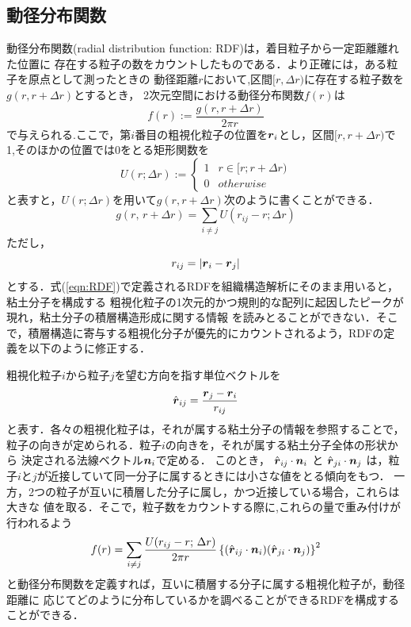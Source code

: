\subsection{動径分布関数\cite{Koide,Warren}}
動径分布関数(radial distribution function: RDF)は，着目粒子から一定距離離れた位置に
存在する粒子の数をカウントしたものである．より正確には，ある粒子を原点として測ったときの
動径距離$r$において,区間$[r,\Delta r)$に存在する粒子数を$g(r,r+\Delta r)$とするとき，
2次元空間における動径分布関数$f(r)$は
\begin{equation}
	f(r):=\frac{g(r,r+\Delta r)}{2\pi r}
	\label{eqn:RDF}
\end{equation}
で与えられる.ここで，第$i$番目の粗視化粒子の位置を$\mbox{\boldmath $r$}_i$とし，区間$[r,r+\Delta r)$で
1,そのほかの位置では0をとる矩形関数を
\begin{equation}
	U(r;\Delta r):=\left\{
		\begin{array}{cc}
			1 &  r \in [r;r+\Delta r)\\
			0 &  otherwise
		\end{array}
	\right.
	\label{eqn:}
\end{equation}
と表すと，$U(r;\Delta r)$を用いて$g(r,r+\Delta r)$次のように書くことができる．
\begin{equation}
	g(r,\,r+\Delta r)=\sum_{i\neq j} U(r_{ij}-r;\Delta r)
	\label{eqn:gr}
\end{equation}
ただし，
\begin{equation}
	r_{ij}=\left|\mbox{\boldmath $r$}_i-\mbox{\boldmath $r$}_j\right|
	\label{eqn:rij}
\end{equation}
とする．式(\ref{eqn:RDF})で定義されるRDFを組織構造解析にそのまま用いると，粘土分子を構成する
粗視化粒子の1次元的かつ規則的な配列に起因したピークが現れ，粘土分子の積層構造形成に関する情報
を読みとることができない．そこで，積層構造に寄与する粗視化分子が優先的にカウントされるよう，RDFの定義を以下のように修正する．

粗視化粒子$i$から粒子$j$を望む方向を指す単位ベクトルを
\begin{equation}
	\hat{\mbox{\boldmath $r$}}_{ij}=\frac{\mbox{\boldmath $r$}_j-\mbox{\boldmath $r$}_i}{r_{ij}}
	\label{eqn:rhat}
\end{equation}
と表す．各々の粗視化粒子は，それが属する粘土分子の情報を参照することで，
粒子の向きが定められる．粒子$i$の向きを，それが属する粘土分子全体の形状から
決定される法線ベクトル$\mbox{\boldmath $n$}_i$で定める．
このとき，
$\hat{\mbox{\boldmath $r$}}_{ij}\cdot\mbox{\boldmath $n$}_i$
と
$\hat{\mbox{\boldmath $r$}}_{ji}\cdot\mbox{\boldmath $n$}_j$
は，粒子$i$と$j$が近接していて同一分子に属するときには小さな値をとる傾向をもつ．
一方，2つの粒子が互いに積層した分子に属し，かつ近接している場合，これらは大きな
値を取る．そこで，粒子数をカウントする際に,これらの量で重み付けが行われるよう
\begin{equation}
	f(r)=
	\sum_{i\neq j} \frac{U(r_{ij}-r;\, \Delta r)}{2\pi r}
	\left\{
		(\hat{\mbox{\boldmath $r$}}_{ij} \cdot \mbox{\boldmath $n$}_i)
		(\hat{\mbox{\boldmath $r$}}_{ji} \cdot \mbox{\boldmath $n$}_j)
	\right\}^2
	\label{eqn:RDFn}
\end{equation}
と動径分布関数を定義すれば，互いに積層する分子に属する粗視化粒子が，動径距離に
応じてどのように分布しているかを調べることができるRDFを構成することができる．
